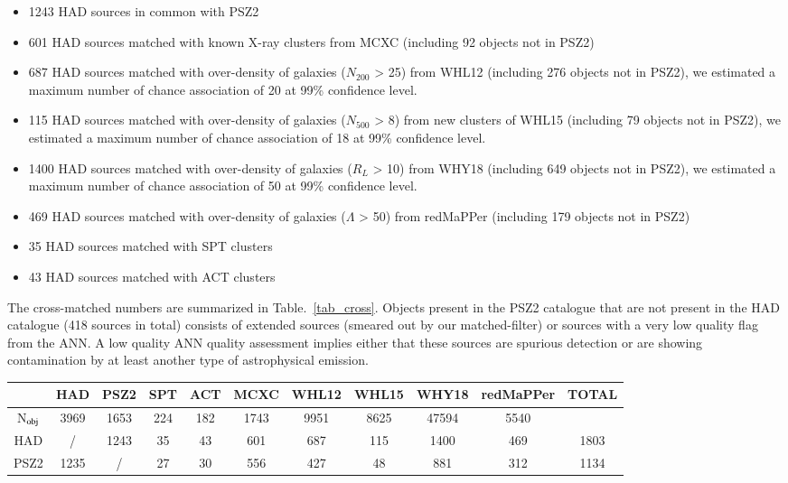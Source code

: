 \documentclass[traditabstract,a4,twocolumn]{aa}
\begin{document}
\begin{itemize}
\item[$\bullet$] 1243 HAD sources in common with PSZ2
\item[$\bullet$] 601 HAD sources matched with known X-ray clusters from MCXC
  (including 92 objects not in PSZ2)
\item[$\bullet$] 687 HAD sources matched with over-density of galaxies ($N_{200}$ > 25) from
  WHL12 (including 276 objects not in PSZ2), we estimated
  a maximum number of chance association of 20 at 99\% confidence
  level.
  \item[$\bullet$] 115 HAD sources matched with over-density of galaxies ($N_{500}$ > 8) from
  new clusters of WHL15 (including 79 objects not in PSZ2), we estimated
  a maximum number of chance association of 18 at 99\% confidence
  level.
 \item[$\bullet$] 1400 HAD sources matched with over-density of galaxies ($R_{L}$ > 10) from
  WHY18 (including 649 objects not in PSZ2), we estimated
  a maximum number of chance association of 50 at 99\% confidence
  level.
\item[$\bullet$] 469 HAD sources matched with over-density of galaxies ($\Lambda$
  > 50) from redMaPPer (including 179 objects not in PSZ2)
\item[$\bullet$] 35 HAD sources matched with SPT clusters
\item[$\bullet$] 43 HAD sources matched with ACT clusters
\end{itemize}
The cross-matched numbers are summarized in Table.~\ref{tab_cross}. Objects present in the PSZ2 catalogue that are not present in the HAD catalogue (418 sources in total) consists of extended sources (smeared out by our matched-filter) or sources with a very low quality flag from the ANN. A low quality ANN quality assessment implies either that these sources are spurious detection or are showing contamination by at least another type of astrophysical emission.

\begin{table*}
\center
\caption{Cross-matched number of objects between HAD and reference catalogues. We also performed the same cross-match for the PSZ2. The total column refers to the number objects from HAD or PSZ2. For Wen+12 catalogue we imposed $N_{200} > 25$, for Wen+15 we imposed $N_{500} > 8$ and for redMaPPer we imposed $\lambda > 50$.}
\begin{tabular}{c|ccccccccc|c}
\label{tab_cross}
& HAD & PSZ2 & SPT & ACT & MCXC & WHL12 & WHL15 & WHY18 & redMaPPer & TOTAL\\
\hline
N$_{\rm obj}$ & 3969 & 1653 & 224 & 182 & 1743 & 9951 & 8625 & 47594 & 5540 & \\
HAD & / & 1243 & \phantom{0}35 & \phantom{0}43 & \phantom{0}601 & \phantom{0}687 & \phantom{0}115 & \phantom{0}1400 & \phantom{0}469 & 1803 \\
PSZ2 & 1235 & / & \phantom{0}27 & \phantom{0}30 & \phantom{0}556 & \phantom{0}427 & \phantom{00}48 & \phantom{00}881 & \phantom{0}312 & 1134 \\

\hline
\end{tabular}
\end{table*}
\end{document}
